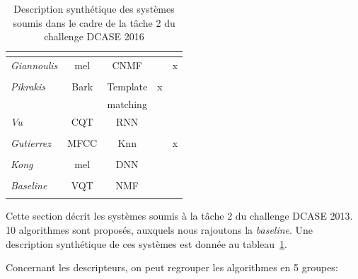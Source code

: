 \begin{table}[t]
\begin{center}
\begin{tabular}{lcccc}
\citep{Phan2016}             &                              &                      &           & \\ 
\hline
\emph{Giannoulis}            &     mel                      & CNMF                 &           & x\\ 
\citep{Giannoulis2016}       &                              &                      &           & \\ 
\hline
\emph{Pikrakis}              &     Bark                     & Template             & x         & \\ 
\citep{Pikrakis2016}         &                              & matching             &           & \\ 
\hline
\emph{Vu}                    &     CQT                      & RNN                  &           & \\ 
\citep{Vu2016}               &                              &                      &           & \\ 
\hline
\emph{Gutierrez}             &     MFCC                     & Knn                  &           & x \\ 
\citep{GutierrezArriola2016} &                              &                      &           & \\ 
\hline
\emph{Kong}                  &     mel                      & DNN                  &           &  \\ 
\citep{Kong2016}             &                              &                      &           & \\ 
\hline  
\emph{Baseline}              &     VQT                      & NMF                  &           & \\ 
\citep{Benetos2016}          &                              &                      &           & \\ 
\hline 
\end{tabular}
\end{center}
\caption{Description synthétique des systèmes soumis dans le cadre de la tâche 2 du challenge DCASE 2016}
\label{tab:systemsDcase2016}
\end{table}

Cette section décrit les systèmes soumis à la tâche 2 du challenge DCASE 2013. 10 algorithmes sont proposés, auxquels nous rajoutons la \emph{baseline}. Une description synthétique de ces systèmes est donnée au tableau~\ref{tab:systemsDcase2016}. 

Concernant les descripteurs, on peut regrouper les algorithmes en 5 groupes:

